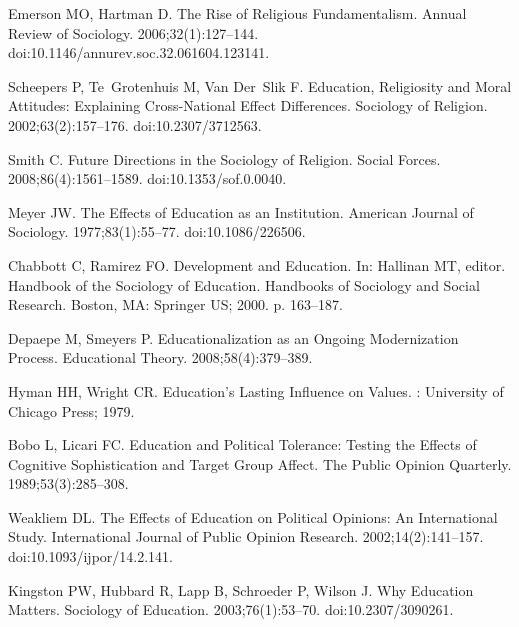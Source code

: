 \documentclass[10pt,letterpaper]{article}
\begin{document}
\begin{thebibliography}{10}
Emerson MO, Hartman D.
\newblock The {{Rise}} of {{Religious Fundamentalism}}.
\newblock Annual Review of Sociology. 2006;32(1):127--144.
\newblock doi:{10.1146/annurev.soc.32.061604.123141}.

Scheepers P, Te~Grotenhuis M, Van Der~Slik F.
\newblock Education, {{Religiosity}} and {{Moral Attitudes}}: {{Explaining
  Cross}}-{{National Effect Differences}}.
\newblock Sociology of Religion. 2002;63(2):157--176.
\newblock doi:{10.2307/3712563}.

Smith C.
\newblock Future {{Directions}} in the {{Sociology}} of {{Religion}}.
\newblock Social Forces. 2008;86(4):1561--1589.
\newblock doi:{10.1353/sof.0.0040}.

Meyer JW.
\newblock The {{Effects}} of {{Education}} as an {{Institution}}.
\newblock American Journal of Sociology. 1977;83(1):55--77.
\newblock doi:{10.1086/226506}.

Chabbott C, Ramirez FO.
\newblock Development and {{Education}}.
\newblock In: Hallinan MT, editor. Handbook of the {{Sociology}} of
  {{Education}}. Handbooks of {{Sociology}} and {{Social Research}}. {Boston,
  MA}: {Springer US}; 2000. p. 163--187.

Depaepe M, Smeyers P.
\newblock Educationalization as an {{Ongoing Modernization Process}}.
\newblock Educational Theory. 2008;58(4):379--389.

Hyman HH, Wright CR.
\newblock Education's {{Lasting Influence}} on {{Values}}.
: {University of Chicago Press}; 1979.

Bobo L, Licari FC.
\newblock Education and {{Political Tolerance}}: {{Testing}} the {{Effects}} of
  {{Cognitive Sophistication}} and {{Target Group Affect}}.
\newblock The Public Opinion Quarterly. 1989;53(3):285--308.

Weakliem DL.
\newblock The {{Effects}} of {{Education}} on {{Political Opinions}}: {{An
  International Study}}.
\newblock International Journal of Public Opinion Research.
  2002;14(2):141--157.
\newblock doi:{10.1093/ijpor/14.2.141}.

Kingston PW, Hubbard R, Lapp B, Schroeder P, Wilson J.
\newblock Why {{Education Matters}}.
\newblock Sociology of Education. 2003;76(1):53--70.
\newblock doi:{10.2307/3090261}.


\end{thebibliography}
\end{document}

